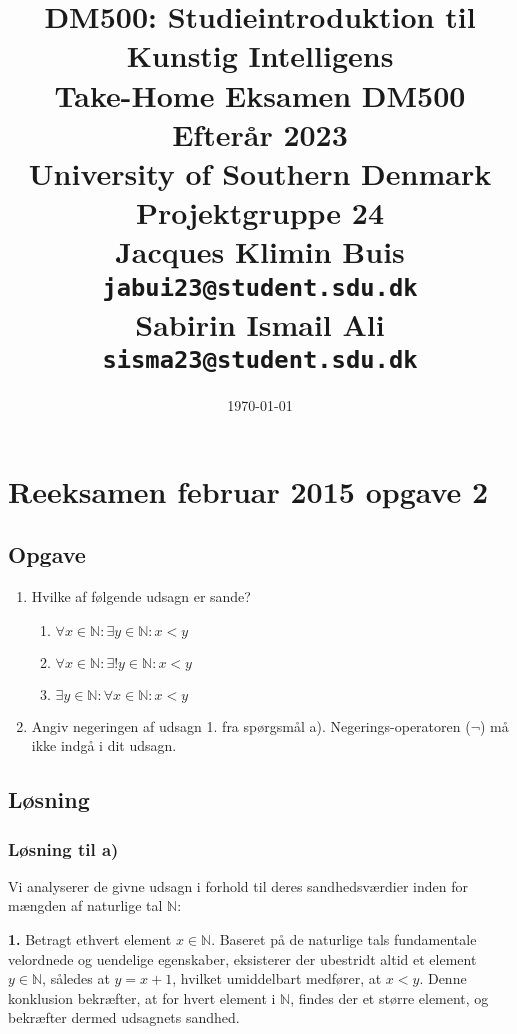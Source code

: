 \documentclass[12pt]{article}
\title{ 
    \vspace{2in} %
    \textbf{DM500: Studieintroduktion til Kunstig Intelligens}\\ %
    \vspace{0.25in} %
    \textbf{Take-Home Eksamen DM500 Efterår 2023}\\ %
    \vspace{0.25in} %
    \Large University of Southern Denmark\\ %
    \vspace{1in} %
    \Large \textbf{Projektgruppe 24}\\ %
    \vspace{0.25in} %
    \normalsize Jacques Klimin Buis \\ %
    \texttt{jabui23@student.sdu.dk} \\ %
    \normalsize Sabirin Ismail Ali \\ %
    \texttt{sisma23@student.sdu.dk} %
}
\author{} %
\date{\today} %
\begin{document}
\maketitle
\thispagestyle{empty} %
\newpage

\tableofcontents
\thispagestyle{empty}
\newpage

\setcounter{page}{1}

\section{Reeksamen februar 2015 opgave 2}

\subsection{Opgave}
\begin{enumerate}[label=\alph*)] %
    \item Hvilke af følgende udsagn er sande?
    \begin{enumerate}[label=\arabic*.] %
        \item \(\forall x \in \mathbb{N}: \exists y \in \mathbb{N}: x < y\)
        \item \(\forall x \in \mathbb{N}: \exists! y \in \mathbb{N}: x < y\)
        \item \(\exists y \in \mathbb{N}: \forall x \in \mathbb{N}: x < y\)
    \end{enumerate}
    \item Angiv negeringen af udsagn 1. fra spørgsmål a). Negerings-operatoren (\(\neg\)) må ikke indgå i dit udsagn.
\end{enumerate}

\subsection{Løsning}
\subsubsection{Løsning til a)}
Vi analyserer de givne udsagn i forhold til deres sandhedsværdier inden for mængden af naturlige tal \(\mathbb{N}\):

\vspace{0.25in}

\textbf{1.} Betragt ethvert element \(x \in \mathbb{N}\). Baseret på de naturlige tals fundamentale velordnede og uendelige egenskaber, eksisterer der ubestridt altid et element \(y \in \mathbb{N}\), således at \(y = x + 1\), hvilket umiddelbart medfører, at \(x < y\). Denne konklusion bekræfter, at for hvert element i \(\mathbb{N}\), findes der et større element, og bekræfter dermed udsagnets sandhed. 
\end{document}
